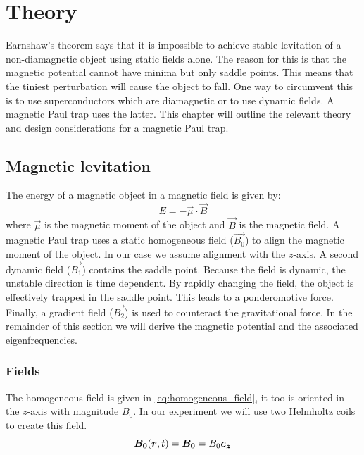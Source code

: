 \chapter{Theory}
\label{chap:theory}
Earnshaw's theorem says that it is impossible to achieve stable levitation of a non-diamagnetic object using static fields alone. The reason for this is that the magnetic potential cannot have minima but only saddle points. This means that the tiniest perturbation will cause the object to fall. One way to circumvent this is to use superconductors which are diamagnetic or to use dynamic fields. A magnetic Paul trap uses the latter. This chapter will outline the relevant theory and design considerations for a magnetic Paul trap.

\section{Magnetic levitation}
\label{sec:magnetic_levitation}
The energy of a magnetic object in a magnetic field is given by:
\begin{equation}
    E = -\vec{\mu} \cdot \vec{B}
    \tag{magnetic potential}
    \label{eq:magnetic_potential_definition}
\end{equation}
where $\vec{\mu}$ is the magnetic moment of the object and $\vec{B}$ is the magnetic field. A magnetic Paul trap uses a static homogeneous field ($\vec{B_0}$) to align the magnetic moment of the object. In our case we assume alignment with the $z$-axis. A second dynamic field ($\vec{B_1}$) contains the saddle point. Because the field is dynamic, the unstable direction is time dependent. By rapidly changing the field, the object is effectively trapped in the saddle point. This leads to a ponderomotive force\cite{perdriat}. Finally, a gradient field ($\vec{B_2}$) is used to counteract the gravitational force\cite{perdriat}. In the remainder of this section we will derive the magnetic potential and the associated eigenfrequencies.

\subsection{Fields}
\label{subsec:fields}
The homogeneous field is given in \autoref{eq:homogeneous_field}, it too is oriented in the $z$-axis with magnitude $B_0$. In our experiment we will use two Helmholtz coils to create this field.
\begin{equation}
    \bm{B_0}(\bm{r}, t) = \bm{B_0} = B_0 \bm{e_z}
    \label{eq:homogeneous_field}
\end{equation}

